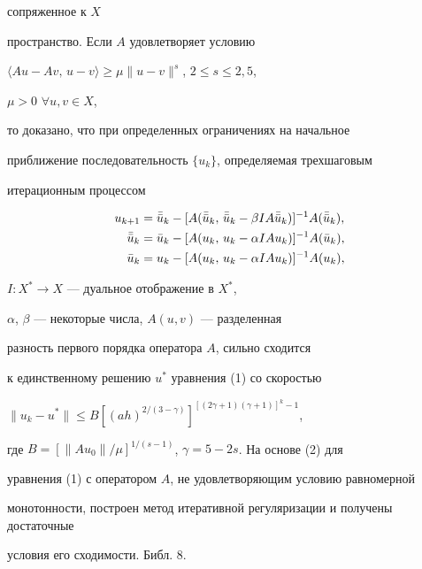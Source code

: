 сопряженное к $X$


пространство. Если $A$ удовлетворяет условию


$\langle Au-Av,\,u-v\rangle\ge\mu\|u-v\|^s$, $2\le s\le 2,5$,


$\mu>0$ $\forall u,v\in X$,


то доказано, что при определенных ограничениях на начальное


приближение последовательность $\{u_k\}$, определяемая трехшаговым


итерационным процессом


\begin{align}


u_{k+1}&=\Bar{\Bar u}_k-[A(\Bar{\Bar u}_k,\,\Bar{\Bar u}_k-


\beta IA\Bar{\Bar u}_k)]^{-1}A(\Bar{\Bar u}_k),\notag\\


\Bar{\Bar u}_k&=\Bar u_k-[A(u_k,\,u_k-\alpha IAu_k)]^{-1}


A(\Bar u_k),\\


\Bar u_k &=u_k-[A(u_k,\,u_k-\alpha IAu_k)]^{-1}A(u_k),\notag


\end{align}


$I:X^*\to X$ --- дуальное отображение в $X^*$,


$\alpha$, $\beta$ --- некоторые числа, $A(u,v)$ --- разделенная


разность первого порядка оператора $A$, сильно сходится


к единственному решению $u^*$ уравнения (1) со скоростью


$\|u_k-u^*\|\le B[(ah)^{2/(3-\gamma)}]^{[(2\gamma+1)(\gamma+1)]^k-1}$,


где $B=[\|Au_0\|/\mu]^{1/(s-1)}$, $\gamma=5-2s$. На основе (2) для 


уравнения (1) с оператором $A$, не удовлетворяющим условию равномерной 


монотонности, построен метод итеративной регуляризации и получены достаточные


условия его сходимости. \; Библ. 8.








